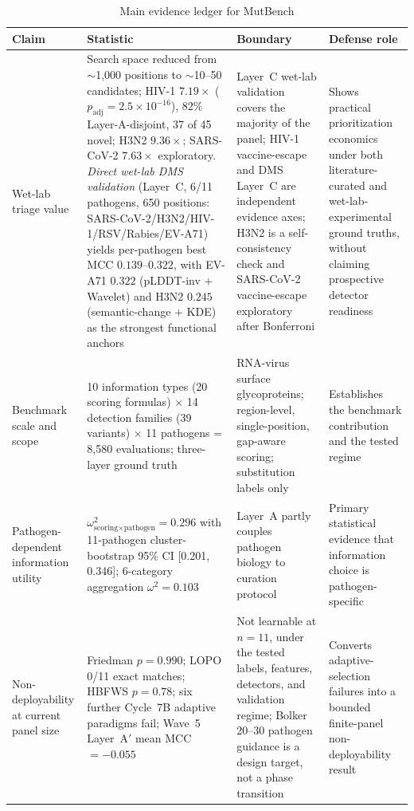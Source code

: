\begin{table}[htbp]
\centering
\caption{Main evidence ledger for MutBench}
\label{tab:abstract_evidence_ledger}
\small
\begin{tabularx}{\textwidth}{p{}p{}p{}X}
\toprule
\textbf{Claim} & \textbf{Statistic} & \textbf{Boundary} & \textbf{Defense role} \\
\midrule
Wet-lab triage value & Search space reduced from $\sim$1{,}000 positions to $\sim$10--50 candidates; HIV-1 $7.19\times$ ($p_{\text{adj}} = 2.5 \times 10^{-16}$), $82\%$ Layer-A-disjoint, 37 of 45 novel; H3N2 $9.36\times$; SARS-CoV-2 $7.63\times$ exploratory. \emph{Direct wet-lab DMS validation} (Layer~C, 6/11 pathogens, 650 positions: SARS-CoV-2/H3N2/HIV-1/RSV/Rabies/EV-A71) yields per-pathogen best MCC $0.139$--$0.322$, with EV-A71 $0.322$ (pLDDT-inv + Wavelet) and H3N2 $0.245$ (semantic-change + KDE) as the strongest functional anchors & Layer~C wet-lab validation covers the majority of the panel; HIV-1 vaccine-escape and DMS Layer~C are independent evidence axes; H3N2 is a self-consistency check and SARS-CoV-2 vaccine-escape exploratory after Bonferroni & Shows practical prioritization economics under both literature-curated and wet-lab-experimental ground truths, without claiming prospective detector readiness \\
Benchmark scale and scope & 10 information types (20 scoring formulas) $\times$ 14 detection families (39 variants) $\times$ 11 pathogens = 8{,}580 evaluations; three-layer ground truth & RNA-virus surface glycoproteins; region-level, single-position, gap-aware scoring; substitution labels only & Establishes the benchmark contribution and the tested regime \\
Pathogen-dependent information utility & $\omega^2_{\text{scoring}\times\text{pathogen}} = 0.296$ with 11-pathogen cluster-bootstrap 95\% CI [0.201, 0.346]; 6-category aggregation $\omega^2 = 0.103$ & Layer~A partly couples pathogen biology to curation protocol & Primary statistical evidence that information choice is pathogen-specific \\
Non-deployability at current panel size & Friedman $p = 0.990$; LOPO 0/11 exact matches; HBFWS $p = 0.78$; six further Cycle~7B adaptive paradigms fail; Wave~5 Layer~A$'$ mean MCC $= -0.055$ & Not learnable at $n=11$, under the tested labels, features, detectors, and validation regime; Bolker 20--30 pathogen guidance is a design target, not a phase transition & Converts adaptive-selection failures into a bounded finite-panel non-deployability result \\
\bottomrule
\end{tabularx}
\end{table}

